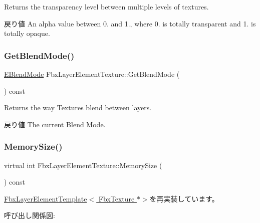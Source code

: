 Returns the transparency level between multiple levels of textures. \begin{DoxyReturn}{戻り値}
An alpha value between 0. and 1., where 0. is totally transparent and 1. is totally opaque. 
\end{DoxyReturn}
\mbox{\label{class_fbx_layer_element_texture_aa4ddd6daddc1785bb6ccf579545b5ff3}} 
\subsubsection{\texorpdfstring{Get\+Blend\+Mode()}{GetBlendMode()}}
{\footnotesize\ttfamily \hyperlink{class_fbx_layer_element_texture_a95d9277da243733eae14d4d0141f77ea}{E\+Blend\+Mode} Fbx\+Layer\+Element\+Texture\+::\+Get\+Blend\+Mode (\begin{DoxyParamCaption}{ }\end{DoxyParamCaption}) const}

Returns the way Textures blend between layers. \begin{DoxyReturn}{戻り値}
The current Blend Mode. 
\end{DoxyReturn}
\mbox{\label{class_fbx_layer_element_texture_aa6ee4c7c56a71d1a3f70fa4e0806e1f5}} 
\subsubsection{\texorpdfstring{Memory\+Size()}{MemorySize()}}
{\footnotesize\ttfamily virtual int Fbx\+Layer\+Element\+Texture\+::\+Memory\+Size (\begin{DoxyParamCaption}{ }\end{DoxyParamCaption}) const\hspace{0.3cm}{\ttfamily [virtual]}}



\hyperlink{class_fbx_layer_element_template_aa6a7b5ed38b51d4a903f9ed2e715ee79}{Fbx\+Layer\+Element\+Template$<$ Fbx\+Texture $\ast$$>$}を再実装しています。

呼び出し関係図\+:
\mbox{\label{class_fbx_layer_element_texture_a775988b21edfe6a084e306d5f67fd1e8}} 

